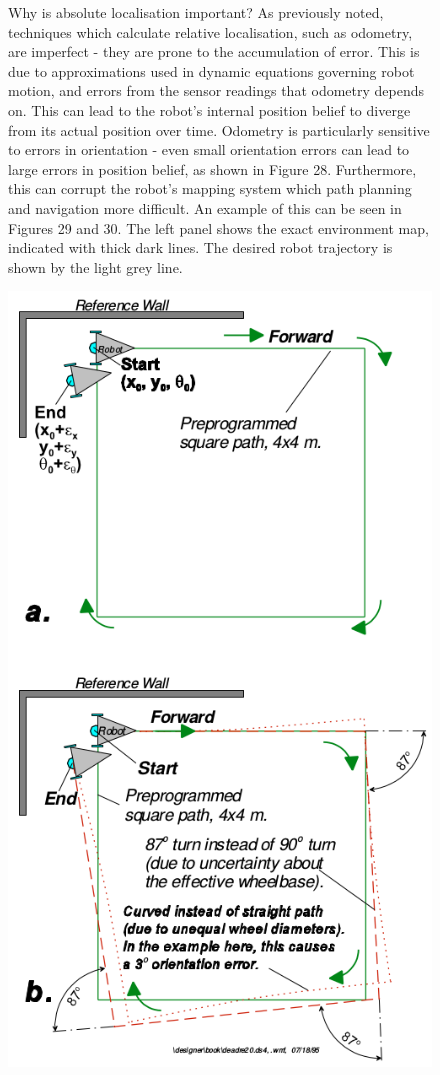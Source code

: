 \documentclass[a4paper]{article}
\begin{document}
\begin{figure}[h]
\begin{minipage}{0.45\textwidth}
Why is absolute localisation important? As previously noted, techniques which calculate relative localisation, such as odometry, are imperfect - they are prone to the accumulation of error. This is due to approximations used in dynamic equations governing robot motion, and errors from the sensor readings that odometry depends on. This can lead to the robot's internal position belief to diverge from its actual position over time. Odometry is particularly sensitive to errors in orientation - even small orientation errors can lead to large errors in position belief, as shown in Figure 28. Furthermore, this can corrupt the robot's mapping system which path planning and navigation more difficult. An example of this can be seen in Figures 29 and 30. The left panel shows the exact environment map, indicated with thick dark lines. The desired robot trajectory is shown by the light grey line. 
\end{minipage}
\hspace{1cm}
\begin{minipage}{0.45\textwidth}
\centering
\includegraphics[scale=0.4]{odom_error}

\end{minipage}
\end{figure}
\end{document}
